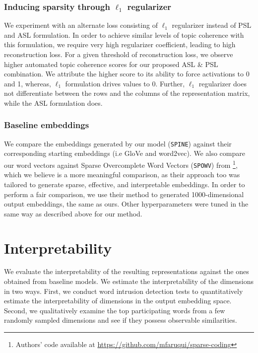 \documentclass[letterpaper]{article} %
\begin{document}
\subsubsection{Inducing sparsity through $\ell_1$ regularizer}
We experiment with an alternate loss consisting of $\ell_{1}$ regularizer instead of PSL and ASL formulation. In order to achieve similar levels of topic coherence with this formulation, we require very high regularizer coefficient, leading to high reconstruction loss. For a given threshold of reconstruction loss, we observe higher automated topic coherence scores for our proposed ASL \& PSL combination. We attribute the higher score to its ability to force activations to 0 and 1, whereas, $\ell_1$ formulation drives values to 0. Further, $\ell_1$ regularizer does not differentiate between the rows and the columns of the representation matrix, while the ASL formulation does.


\subsubsection{Baseline embeddings}
We compare the embeddings generated by our model (\texttt{SPINE}) against their corresponding starting embeddings (i.e GloVe and word2vec).
We also compare our word vectors against Sparse Overcomplete Word Vectors (\texttt{SPOWV}) from \cite{faruqui2015sparse}\footnote{Authors' code available at \url{https://github.com/mfaruqui/sparse-coding}}, which we believe is a more meaningful comparison, as their approach too was tailored to generate sparse, effective, and interpretable embeddings.  In order to perform a fair comparison, we use their method to generated 1000-dimensional output embeddings, the same as ours. Other hyperparameters were tuned in the same way as described above for our method.

\section{Interpretability}

We evaluate the interpretability of the resulting representations against the ones obtained from baseline models.
We estimate the interpretability of the dimensions in two ways. First, we conduct word intrusion detection tests to quantitatively estimate the interpretability of dimensions in the output embedding space. Second, we qualitatively examine the top participating words from a few randomly sampled dimensions and see if they possess observable similarities.
\end{document}
